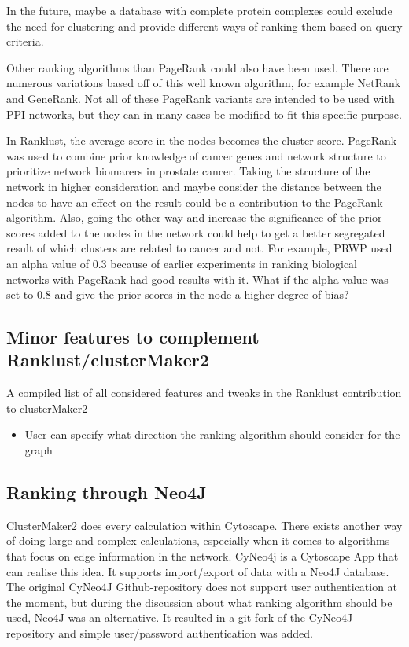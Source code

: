 In the future, maybe a database with complete protein complexes could exclude
the need for clustering and provide different ways of ranking them based on
query criteria.

Other ranking algorithms than PageRank could also have been used. There are
numerous variations based off of this well known algorithm, for example NetRank
and GeneRank\cite{netrank,generank}. Not all of these PageRank variants are
intended to be used with PPI networks, but they can in many cases be modified to
fit this specific purpose.

In Ranklust, the average score in the nodes becomes the cluster score. PageRank
was used to combine prior knowledge of cancer genes and network structure to
prioritize network biomarers in prostate cancer. Taking the structure of the
network in higher consideration and maybe consider the distance between the
nodes to have an effect on the result could be a contribution to the PageRank
algorithm. Also, going the other way and increase the significance of the prior
scores added to the nodes in the network could help to get a better segregated
result of which clusters are related to cancer and not. For example, PRWP used
an alpha value of 0.3 because of earlier experiments in ranking biological
networks with PageRank had good results with it. What if the alpha value was set
to 0.8 and give the prior scores in the node a higher degree of bias?

\subsection{Minor features to complement Ranklust/clusterMaker2}
A compiled list of all considered features and tweaks in the Ranklust
contribution to clusterMaker2

\begin{itemize}
    \item User can specify what direction the ranking algorithm should consider
        for the graph
\end{itemize}

\subsection{Ranking through Neo4J}
ClusterMaker2 does every calculation within Cytoscape. There exists another way
of doing large and complex calculations, especially when it comes to algorithms
that focus on edge information in the network. CyNeo4j\cite{cyneo4j} is
a Cytoscape App that can realise this idea. It supports import/export of data
with a Neo4J\cite{neo4j} database. The original CyNeo4J Github-repository does
not support user authentication at the moment, but during the discussion about
what ranking algorithm should be used, Neo4J was an alternative. It resulted in
a git fork\cite{git-fork} of the CyNeo4J repository and simple user/password
authentication was added.

